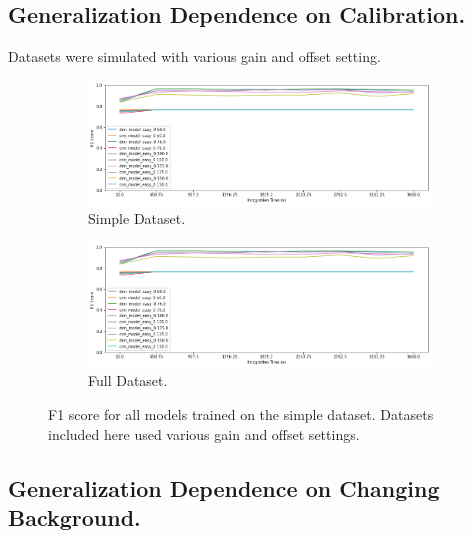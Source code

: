 \subsection{Generalization Dependence on Calibration.}

Datasets were simulated with various gain and offset setting.

\begin{figure}[H]
     \centering
     \begin{subfigure}[b]{0.9\textwidth}
         \centering
         \includegraphics[width=\textwidth]{images/results_easy_distance_comparison}
         \caption{Simple Dataset.}
         \label{fig:results_easy_distance_comparison_simple}
     \end{subfigure}

     \begin{subfigure}[b]{0.9\textwidth}
         \centering
         \includegraphics[width=\textwidth]{images/results_easy_distance_comparison}
         \caption{Full Dataset.}
         \label{fig:results_easy_distance_comparison_full}
     \end{subfigure}
        \caption{F1 score for all models trained on the simple dataset. Datasets included here used various gain and offset settings.}
        \label{fig:results_easy_distance_comparison}
\end{figure}



\subsection{Generalization Dependence on Changing Background.}

